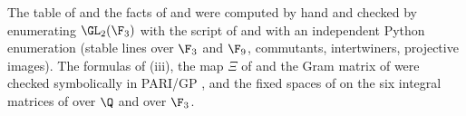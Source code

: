 The table of  and the facts of  and  were computed by hand and checked by
enumerating $\GL_2(\F_3)$ with the script of  and with an independent Python enumeration (stable lines over $\F_3$ and $\F_9$,
commutants, intertwiners, projective images). The formulas of (iii), the map $\Xi$ of  and the Gram
matrix of  were checked symbolically in PARI/GP \cite{PARI}, and the fixed spaces of  on the six
integral matrices of  over $\Q$ and over $\F_3$.
